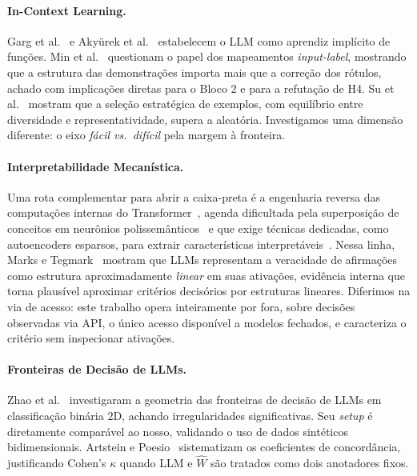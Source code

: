 \documentclass[12pt,a4paper]{article}
\newcommand{\West}{\ensuremath{\hat{W}}}   %
\begin{document}
\paragraph{In-Context Learning.}
Garg et al.~\cite{gargWhatTransformers2022} e Akyürek et al.~\cite{akyurekWhatLearning2023}
estabelecem o LLM como aprendiz implícito de funções. Min et
al.~\cite{minRethinkingRole2022} questionam o papel dos mapeamentos \emph{input-label},
mostrando que a estrutura das demonstrações importa mais que a correção dos rótulos, achado
com implicações diretas para o Bloco 2 e para a refutação de H4. Su et
al.~\cite{suSelectiveAnnotation2023} mostram que a seleção estratégica de exemplos, com
equilíbrio entre diversidade e representatividade, supera a aleatória. Investigamos uma
dimensão diferente: o eixo \emph{fácil vs.\ difícil} pela margem à fronteira.

\paragraph{Interpretabilidade Mecanística.}
Uma rota complementar para abrir a caixa-preta é a engenharia reversa das computações
internas do Transformer~\cite{elhageMathematicalFramework2021}, agenda dificultada pela
superposição de conceitos em neurônios polissemânticos~\cite{elhageToyModels2022} e que
exige técnicas dedicadas, como autoencoders esparsos, para extrair características
interpretáveis~\cite{brickenMonosemanticity2023}. Nessa linha, Marks e
Tegmark~\cite{marksGeometryTruth2024} mostram que LLMs representam a veracidade de
afirmações como estrutura aproximadamente \emph{linear} em suas ativações, evidência
interna que torna plausível aproximar critérios decisórios por estruturas lineares.
Diferimos na via de acesso: este trabalho opera inteiramente por fora, sobre decisões
observadas via API, o único acesso disponível a modelos fechados, e caracteriza o critério
sem inspecionar ativações.

\paragraph{Fronteiras de Decisão de LLMs.}
Zhao et al.~\cite{zhaoProbing2024} investigaram a geometria das fronteiras de decisão de LLMs
em classificação binária $2$D, achando irregularidades significativas. Seu \emph{setup} é
diretamente comparável ao nosso, validando o uso de dados sintéticos bidimensionais.
Artstein e Poesio~\cite{artsteinInterCoder2008} sistematizam os coeficientes de concordância,
justificando Cohen's $\kappa$ quando LLM e \West{} são tratados como dois anotadores fixos.
\end{document}
